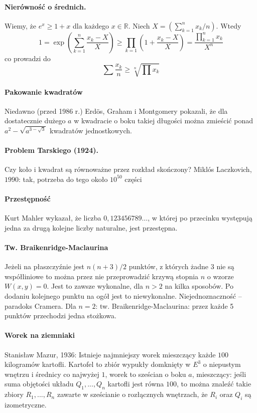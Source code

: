 \begin{parnumbers}
\paragraph{Nierówność o średnich.} Wiemy, że $e^x\ge 1 + x$ dla każdego $x \in \mathbb R$. Niech $X = \left(\sum_{k=1}^n x_k/ n\right) $. Wtedy \[1 = \exp \left(\sum_{k=1}^n \frac{x_k-X}{X}\right) \ge \prod_{k=1} \left(1+ \frac{x_k - X}{X} \right) = \frac{\prod_{k=1}^{n}x_k}{X^n}\] co prowadzi do \[\sum \frac{x_k}{n} \ge \sqrt[n]{\prod x_k}\]

\paragraph{Pakowanie kwadratów} Niedawno (przed 1986 r.) Erdös, Graham i Montgomery pokazali, że dla dostatecznie dużego $a$ w kwadracie o boku takiej długości można zmieścić ponad $a^2 - \sqrt{a^{3-\sqrt{3}}}$ kwadratów jednostkowych.

\paragraph{Problem Tarskiego (1924).} Czy koło i kwadrat są równoważne przez rozkład skończony? Miklós Laczkovich, $1990$: tak, potrzeba do tego około $10^{50}$ części

\paragraph{Przestępność} Kurt Mahler wykazał, że liczba $0,123456789\dots$, w której po przecinku występują jedna za drugą kolejne liczby naturalne, jest przestępna.

\paragraph{Tw. Braikenridge-Maclaurina} Jeżeli na płaszczyźnie jest $n(n+3)/2$ punktów, z których żadne $3$ nie są współliniowe to można przez nie przeprowadzić krzywą stopnia $n$ o wzorze $W(x,y) = 0$. Jest to zawsze wykonalne, dla $n > 2$ na kilka sposobów. Po dodaniu kolejnego punktu na ogół jest to niewykonalne. Niejednoznaczność -- paradoks Cramera. Dla $n = 2$: tw. Braikenridge-Maclaurina: przez każde 5 punktów przechodzi jedna stożkowa.

\paragraph{Worek na ziemniaki} Stanisław Mazur, 1936: Istnieje najmniejszy worek mieszczący każde $100$ kilogramów kartofli. Kartofel to zbiór wypukły domknięty w $E^3$ o niepustym wnętrzu i średnicy co najwyżej $1$, worek to sześcian o boku $a$, mieszczący: jeśli suma objętości układu $Q_1,...,Q_n$ kartofli jest równa $100$, to można znaleźć takie zbiory $R_1,...,R_n$ zawarte w sześcianie o rozłącznych wnętrzach, że $R_i$ oraz $Q_i$ są izometryczne.


\end{parnumbers}
